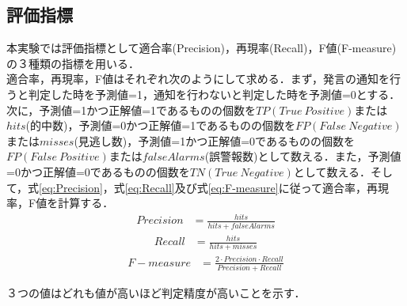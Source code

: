 \subsection{評価指標}
本実験では評価指標として適合率(Precision)，再現率(Recall)，F値(F-measure)の３種類の指標を用いる．\\
適合率，再現率，F値はそれぞれ次のようにして求める．まず，発言の通知を行うと判定した時を予測値=1，通知を行わないと判定した時を予測値=0とする．次に，予測値=1かつ正解値=1であるものの個数を$TP(True~Positive)$または$hits$(的中数)，予測値=0かつ正解値=1であるものの個数を$FP(False~Negative)$または$misses$(見逃し数)，予測値=1かつ正解値=0であるものの個数を$FP(False~Positive)$または$falseAlarms$(誤警報数)として数える．また，予測値=0かつ正解値=0であるものの個数を$TN(True~Negative)$として数える．そして，式\ref{eq:Precision}，式\ref{eq:Recall}及び式\ref{eq:F-measure}に従って適合率，再現率，F値を計算する．
\begin{equation}
\begin{aligned}
\label{eq:Precision}
Precision & = \frac{hits}{hits+falseAlarms}
\end{aligned}
\end{equation}
%
\begin{equation}
\begin{aligned}
\label{eq:Recall}
Recall & = \frac{hits}{hits+misses}
\end{aligned}
\end{equation}
%
\begin{equation}
\begin{aligned}
\label{eq:F-measure}
F-measure & = \frac{2 \cdot Precision \cdot Recall}{Precision+Recall}
\end{aligned}
\end{equation}

３つの値はどれも値が高いほど判定精度が高いことを示す．

